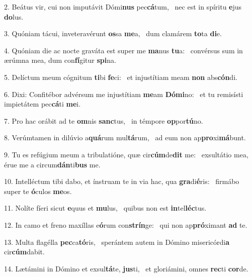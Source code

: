 2. Beátus vir, cui non imputávit Dómi\textbf{nus} pec\textbf{cá}tum, \ast\  nec est in spíritu \textbf{e}jus \textbf{do}lus.\

3. Quóniam tácui, inveteravérunt \textbf{os}sa \textbf{me}a, \ast\  dum clamárem \textbf{to}ta \textbf{di}e.\

4. Quóniam die ac nocte graváta est super me \textbf{ma}nus \textbf{tu}a: \ast\  convérsus sum in ærúmna mea, dum con\textbf{fí}gitur \textbf{spi}na.\

5. Delíctum meum cógnitum \textbf{ti}bi \textbf{fe}ci: \ast\  et injustítiam meam \textbf{non} abs\textbf{cón}di.\

6. Dixi: Confitébor advérsum me injustítiam \textbf{me}am \textbf{Dó}\textbf{mi}no: \ast\  et tu remisísti impietátem pec\textbf{cá}ti \textbf{me}i.\

7. Pro hac orábit ad te \textbf{om}nis \textbf{sanc}tus, \ast\  in témpore \textbf{op}por\textbf{tú}no.\

8. Verúmtamen in dilúvio a\textbf{quá}rum mul\textbf{tá}rum, \ast\  ad eum non ap\textbf{pro}xi\textbf{má}bunt.\

9. Tu es refúgium meum a tribulatióne, quæ cir\textbf{cúm}de\textbf{dit} me: \ast\  exsultátio mea, érue me a circum\textbf{dán}ti\textbf{bus} me.\

10. Intelléctum tibi dabo, et ínstruam te in via hac, qua \textbf{gra}di\textbf{é}ris: \ast\  firmábo super te \textbf{ó}culos \textbf{me}os.\

11. Nolíte fíeri sicut \textbf{e}quus et \textbf{mu}lus, \ast\  quibus non est \textbf{in}tel\textbf{léc}tus.\

12. In camo et freno maxíllas e\textbf{ó}rum con\textbf{strín}ge: \ast\  qui non ap\textbf{pró}ximant \textbf{ad} te.\

13. Multa flagélla \textbf{pec}ca\textbf{tó}ris, \ast\  sperántem autem in Dómino misericórdi\textbf{a} cir\textbf{cúm}dabit.\

14. Lætámini in Dómino et exsul\textbf{tá}te, \textbf{jus}ti, \ast\  et gloriámini, omnes \textbf{rec}ti \textbf{cor}de.\

